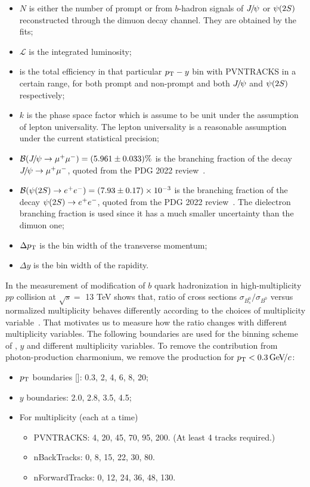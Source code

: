 \begin{itemize}
\item $N$ is either the number of prompt \psitwos or \psitwos from $b$-hadron signals of ${{J\mskip -3mu/\mskip -2mu\psi}}$ or ${\psi{(2S)}}$ reconstructed through the dimuon decay channel. They are obtained by the fits;
\item $\mathcal{L}$ is the integrated luminosity;
\item \effTot is the total efficiency in that particular $p_{\mathrm{T}}-y$ bin with PVNTRACKS in a certain range, for both prompt and non-prompt and both  ${{J\mskip -3mu/\mskip -2mu\psi}}$ and ${\psi{(2S)}}$ respectively;
\item $k$ is the phase space factor which is assume to be unit under the assumption of lepton universality.
The lepton universality is a reasonable assumption under the current statistical precision;
\item ${\mathcal{B}}({{J\mskip -3mu/\mskip -2mu\psi}}\rightarrow\mu^+\mu^-)=(5.961\pm0.033)\%$ is the branching fraction of the decay ${{J\mskip -3mu/\mskip -2mu\psi}}\rightarrow \mu^+ \mu^-$, quoted from the PDG 2022 review~\cite{Workman:2022ynf}.
\item ${\mathcal{B}}({\psi{(2S)}}\rightarrow e^+e^-)=(7.93\pm0.17)\times10^{-3}$ is the branching fraction of the decay ${\psi{(2S)}}\rightarrow e^+ e^-$, quoted from the PDG 2022 review~\cite{Workman:2022ynf}. The dielectron branching fraction is used since it has a much smaller uncertainty than the dimuon one;
\item $\Delta p_{\mathrm{T}}$ is the bin width of the transverse momentum;
\item $\Delta y$ is the bin width of the rapidity.
\end{itemize}
In the measurement of  modification of $b$ quark hadronization in high-multiplicity $pp$ collision at $\sqrt{s}=$ 13 TeV shows that, ratio of cross sections $\sigma_{B_s^0}/\sigma_{B^0}$ versus normalized multiplicity behaves differently according to the choices of multiplicity variable~\cite{LHCb:2022syj}. That motivates us to measure how the ratio changes with different multiplicity variables.
The following boundaries are used for the binning scheme of \pt, $y$ and different multiplicity variables. To remove the contribution from photon-production charmonium, we remove the production for $p_{\mathrm{T}}<0.3\text{\,Ge\kern -0.1em V\!/}c$:
\begin{itemize}
\item $p_{\mathrm{T}}$ boundaries [\gevc]: 0.3, 2, 4, 6, 8, 20; 
\item $y$ boundaries: 2.0, 2.8, 3.5, 4.5;
\item For multiplicity (each at a time)
\begin{itemize}
  \item PVNTRACKS: 4, 20, 45, 70, 95, 200. (At least 4 tracks required.)
  \item nBackTracks: 0, 8, 15, 22, 30, 80.
  \item nForwardTracks: 0, 12, 24, 36, 48, 130.
\end{itemize}  
\end{itemize}
